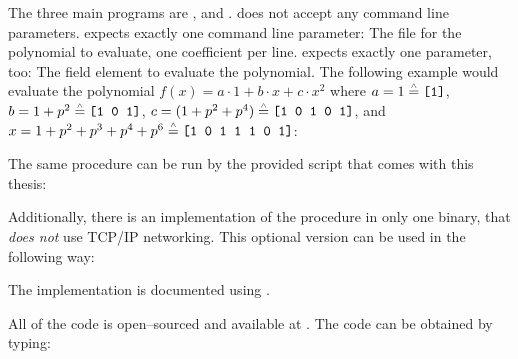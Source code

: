%
%
\label{sec:usage}

The three main programs are \JWBpOne{}, \JWBpTwo{} and \JWBtoken{}. \JWBtoken{}
does not accept any command line parameters. \JWpOne{} expects exactly one
command line parameter: The file for the polynomial to evaluate, one coefficient
per line. \JWpTwo{} expects exactly one parameter, too: The field element to
evaluate the polynomial. The following example would evaluate the polynomial
$f(x) = a \cdot 1 + b \cdot x + c \cdot x^2$ where $a = 1 \stackrel{\scriptscriptstyle\wedge}{=}
\text{\texttt{[1]}}$, $b = 1 + p^2 \stackrel{\scriptscriptstyle\wedge}{=} \text{\texttt{[1 0 1]}}$,
$c = (1 + p^2 + p^4) \stackrel{\scriptscriptstyle\wedge}{=} \text{\texttt{[1 0 1 0 1]}}$, and $x = 1 + p^2
+ p^3 + p^4 + p^6 \stackrel{\scriptscriptstyle\wedge}{=} \text{\texttt{[1 0 1 1 1 0 1]}}$:





\noindent{}The same procedure can be run by the provided
 script that comes with this thesis:


\noindent{}Additionally, there is an implementation of the procedure in only one
binary, that \emph{does not} use TCP/IP networking. This optional version can be
used in the following way:


%
%
\label{sec:implementation-doc}

The implementation is documented using \JWTLhaddock{}.



%
%
\label{sec:code-availability}

All of the code is open--sourced and available at
. The code can
be obtained by typing:



